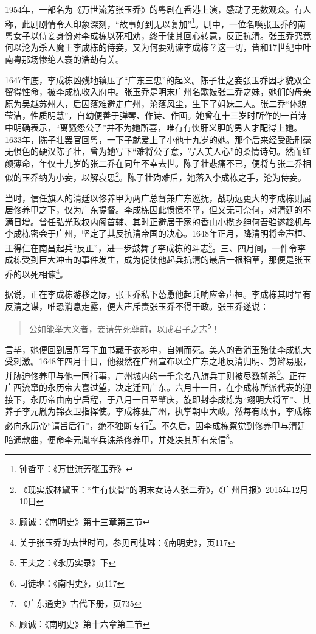 1954年，一部名为《万世流芳张玉乔》的粤剧在香港上演，感动了无数观众。有人称，此剧剧情令人印象深刻，“故事好到无以复加”\footnote{钟哲平：《万世流芳张玉乔》}。剧中，一位名唤张玉乔的南粤女子以侍妾身份对李成栋以死相劝，终于使其回心转意，反正抗清。张玉乔究竟何以沦为杀人魔王李成栋的侍妾，又为何要劝谏李成栋？这一切，皆和17世纪中叶南粤那场惨绝人寰的浩劫有关。

1647年底，李成栋凶残地镇压了“广东三忠”的起义。陈子壮之妾张玉乔因才貌双全留得性命，被李成栋收入府中。张玉乔是明末广州名歌妓张二乔之妹，她们的母亲原为吴越苏州人，后因落难避走广州，沦落风尘，生下了姐妹二人。张二乔“体貌莹洁，性质明慧”，自幼便善于弹琴、作诗、作画。她曾在十三岁时所作的一首诗中明确表示，“离骚怨公子”并不为她所喜，唯有有侠肝义胆的男人才配得上她。1633年，陈子壮罢官回粤，一下子就爱上了小他十九岁的她。那个后来经受酷刑毫无惧色的硬汉陈子壮，曾为她写下“难将公子意，写入美人心”的柔情诗句。然而红颜薄命，年仅十九岁的张二乔在同年不幸去世。陈子壮悲痛不已，便将与张二乔相似的玉乔纳为小妾，以解哀思\footnote{《现实版林黛玉：“生有侠骨”的明末女诗人张二乔》，《广州日报》2015年12月10日}。陈子壮殉难后，她落入李成栋之手，沦为侍妾。

当时，信任旗人的清廷以佟养甲为两广总督兼广东巡抚，战功远更大的李成栋则屈居佟养甲之下，仅为广东提督。李成栋因此愤愤不平，但又无可奈何，对清廷的不满日增。曾任弘光政权内阁首辅、其时正避居于家的香山小榄乡绅何吾驺遂趁机与李成栋密会于广州，坚定了其反抗清帝国的决心。1648年正月，降清明将金声桓、王得仁在南昌起兵“反正”，进一步鼓舞了李成栋的斗志\footnote{顾诚：《南明史》第十三章第三节}。三、四月间，一件令李成栋受到巨大冲击的事件发生，成为促使他起兵抗清的最后一根稻草，那便是张玉乔的以死相谏\footnote{关于张玉乔的去世时间，参见司徒琳：《南明史》，页117}。

据说，正在李成栋游移之际，张玉乔私下怂恿他起兵响应金声桓。李成栋其时早有反清之谋，唯恐消息走露，便大声斥责张玉乔不得干政。张玉乔遂说：

\begin{quote}

公如能举大义者，妾请先死尊前，以成君子之志\footnote{王夫之：《永历实录》下}！

\end{quote}


言毕，她便回到居所写下血书藏于衣衫中，自刎而死。美人的香消玉殆使李成栋大受刺激。1648年四月十日，他毅然在广州宣布以全广东之地反清归明、剪辫易服，并胁迫佟养甲与他一同行事，广州城内的一千余名八旗兵丁则被尽数斩杀\footnote{司徒琳：《南明史》，页117}。正在广西流窜的永历帝大喜过望，决定迁回广东。六月十一日，在李成栋所派代表的迎接下，永历帝由南宁启程，于八月一日至肇庆，旋即封李成栋为“翊明大将军”、其养子李元胤为锦衣卫指挥使。李成栋驻广州，执掌朝中大政。然每有政事，李成栋必向永历帝“请旨后行”，绝不独断专行\footnote{《广东通史》古代下册，页735}。不久后，因李成栋察觉到佟养甲与清廷暗通款曲，便命李元胤率兵诛杀佟养甲，并处决其所有亲信\footnote{顾诚：《南明史》第十六章第二节}。

